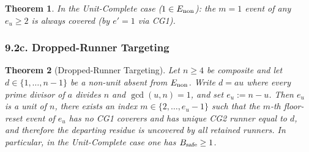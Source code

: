 \documentclass[11pt,a4paper]{article}
\theoremstyle{plain}
\newtheorem{theorem}{Theorem}[section]
\theoremstyle{definition}
\theoremstyle{remark}
\begin{document}
\begin{theorem}
In the Unit-Complete case ($1 \in E_{\rm non}$): the $m=1$ event of any $e_u \geq 2$ is always covered (by $e'=1$ via CG1).

\end{theorem}


\subsubsection{9.2c. Dropped-Runner Targeting}



\begin{theorem}[Dropped-Runner Targeting]
Let $n \geq 4$ be composite and let $d \in \{1,\ldots,n-1\}$ be a non-unit absent from $E_{\rm non}$. Write $d = a u$ where every prime divisor of $a$ divides $n$ and $\gcd(u,n)=1$, and set $e_u := n-u$. Then $e_u$ is a unit of $n$, there exists an index $m \in \{2,\ldots,e_u-1\}$ such that the $m$-th floor-reset event of $e_u$ has no CG1 coverers and has unique CG2 runner equal to $d$, and therefore the departing residue is uncovered by all retained runners. In particular, in the Unit-Complete case one has $B_{\rm safe} \geq 1$.

\end{theorem}
\end{document}
